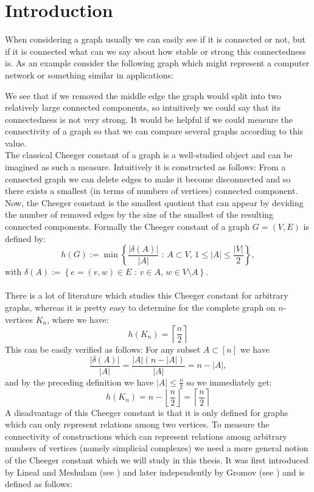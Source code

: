 
\chapter{Introduction}

\label{Introduction}
When considering a graph usually we can easily see if it is connected or not, but if it is connected what can we say about how stable or strong this connectedness is. As an example consider the following graph which might represent a computer network or something similar in applications:



We see that if we removed the middle edge the graph would split into two relatively large connected components, so intuitively we could say that its connectedness is not very strong. It would be helpful if we could measure the connectivity of a graph so that we can compare several graphs according to this value.\\
The classical Cheeger constant of a graph is a well-studied object and can be imagined as such a measure. Intuitively it is constructed as follows: From a connected graph we can delete edges to make it become disconnected and so there exists a smallest (in terms of numbers of vertices) connected component. Now, the Cheeger constant is the smallest quotient that can appear by deviding the number of removed edges by the size of the smallest of the resulting connected components. Formally the Cheeger constant of a graph \(G=(V,E)\) is defined by:
\[
h(G):=\min\left\{\frac{|\delta(A)|}{|A|}\text{ : }A\subset V\text{, }1\leq |A|\leq\frac{|V|}{2}\right\},
\]
with \(\delta(A):=\left\{e=(v,w)\in E\text{ : }v\in A\text{, }w\in V\setminus A\right\}\).\\
\\
There is a lot of literature which studies this Cheeger constant for arbitrary graphs, whereas it is pretty easy to determine for the complete graph on \(n\)-vertices \(K_n\), where we have:
\[
h(K_n)=\left\lceil\frac{n}{2}\right\rceil
\]
This can be easily verified as follows: For any subset \(A\subset [n]\) we have
\[
\frac{|\delta(A)|}{|A|}=\frac{|A|(n-|A|)}{|A|}=n-|A|,
\]
and by the preceding definition we have \(|A|\leq\frac{n}{2}\) so we immediately get:
\[
h(K_n)=n-\left\lfloor\frac{n}{2}\right\rfloor=\left\lceil\frac{n}{2}\right\rceil
\]
A disadvantage of this Cheeger constant is that it is only defined for graphs which can only represent relations among two vertices. To measure the connectivity of constructions which can represent relations among arbitrary numbers of vertices (namely simplicial complexes) we need a more general notion of the Cheeger constant which we will study in this thesis. It was first introduced by Lineal and Meshulam (see \cite{2}) and later independently by Gromov (see \cite{3}) and is defined as follows:\\
